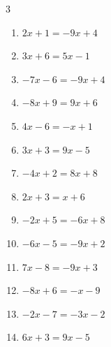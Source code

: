 \begin{multicols}{3}
\begin{enumerate}
        \phantom{$\displaystyle x=5$}

  \item $2x+1=-9x+4$


  \item $3x+6=5x-1$


  \item $-7x-6=-9x+4$

        \phantom{$\displaystyle x=5$}

  \item $-8x+9=9x+6$


  \item $4x-6=-x+1$


\columnbreak %

  \item $3x+3=9x-5$


  \item $-4x+2=8x+8$


  \item $2x+3=x+6$

        \phantom{$\displaystyle x=3$}

  \item $-2x+5=-6x+8$


  \item $-6x-5=-9x+2$


  \item $7x-8=-9x+3$


  \item $-8x+6=-x-9$


  \item $-2x-7=-3x-2$

        \phantom{$\displaystyle x=5$}

  \item $6x+3=9x-5$


\end{enumerate}
\end{multicols}
